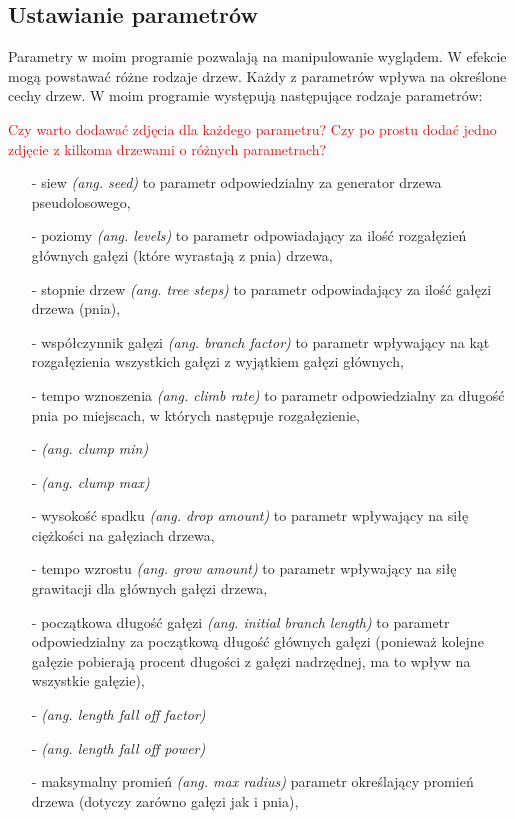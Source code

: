 \documentclass[a4paper,12pt,twoside]{book} %
\begin{document}
\subsection{Ustawianie parametrów}

Parametry w moim programie pozwalają na manipulowanie wyglądem. 
W efekcie mogą powstawać różne rodzaje drzew. 
Każdy z parametrów wpływa na określone cechy drzew. 
W moim programie występują następujące rodzaje parametrów:

\textcolor{red}{Czy warto dodawać zdjęcia 
dla każdego parametru? Czy po prostu dodać 
jedno zdjęcie z kilkoma drzewami o różnych parametrach?}

\begin{itemize}
\setlength\itemsep{1em}
	\item[-] siew \textit{(ang. seed)} to parametr odpowiedzialny za generator drzewa pseudolosowego,
	\item[-] poziomy \textit{(ang. levels)} to parametr odpowiadający za ilość rozgałęzień głównych gałęzi (które wyrastają z pnia) drzewa,
	\item[-] stopnie drzew \textit{(ang. tree steps)} to parametr odpowiadający za ilość gałęzi drzewa (pnia),
	\item[-] współczynnik gałęzi \textit{(ang. branch factor)} to parametr wpływający na kąt rozgałęzienia wszystkich gałęzi z wyjątkiem gałęzi głównych,
	\item[-] tempo wznoszenia \textit{(ang. climb rate)} to parametr odpowiedzialny za długość pnia po miejscach, w których następuje rozgałęzienie,
	\item[-] \textit{(ang. clump min)}
	\item[-] \textit{(ang. clump max)}
	\item[-] wysokość spadku \textit{(ang. drop amount)} to parametr wpływający na siłę ciężkości na gałęziach drzewa,
	\item[-] tempo wzrostu \textit{(ang. grow amount)} to parametr wpływający na siłę grawitacji dla głównych gałęzi drzewa,
	\item[-] początkowa długość gałęzi \textit{(ang. initial branch length)} to parametr odpowiedzialny za początkową długość głównych gałęzi (ponieważ kolejne gałęzie pobierają procent długości z gałęzi nadrzędnej, ma to wpływ na wszystkie gałęzie),
	\item[-] \textit{(ang. length fall off factor)}
	\item[-] \textit{(ang. length fall off power)}
	\item[-] maksymalny promień \textit{(ang. max radius)} parametr określający promień drzewa (dotyczy zarówno gałęzi jak i pnia),

\end{itemize}
\end{document}
